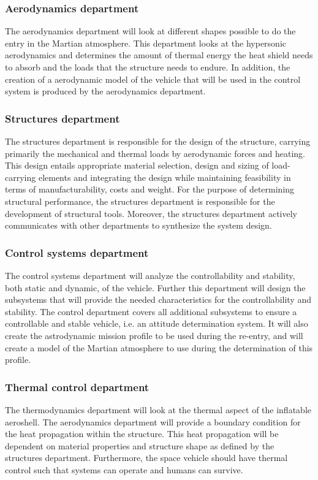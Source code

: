 \subsubsection{Aerodynamics department}\label{subsec:aero}
The aerodynamics department will look at different shapes possible to do the entry in the Martian atmosphere. This department looks at the hypersonic aerodynamics and determines the amount of thermal energy the heat shield needs to absorb and the loads that the structure needs to endure. In addition, the creation of a aerodynamic model of the vehicle that will be used in the control system is produced by the aerodynamics department.

\subsubsection{Structures department}\label{subsec:struct}
The structures department is responsible for the design of the structure, carrying primarily the mechanical and thermal loads by aerodynamic forces and heating. This design entails appropriate material selection, design and sizing of load-carrying elements and integrating the design while maintaining feasibility in terms of manufacturability, costs and weight. For the purpose of determining structural performance, the structures department is responsible for the development of structural tools. Moreover, the structures department actively communicates with other departments to synthesize the system design.

\subsubsection{Control systems department}\label{subsec:control}
The control systems department will analyze the controllability and stability, both static and dynamic, of the vehicle. Further this department will design the subsystems that will provide the needed characteristics for the controllability and stability. The control department covers all additional subsystems to ensure a controllable and stable vehicle, i.e. an attitude determination system. It will also create the astrodynamic mission profile to be used during the re-entry, and will create a model of the Martian atmosphere to use during the determination of this profile.

\subsubsection{Thermal control department}\label{subsec:therm}
The thermodynamics department will look at the thermal aspect of the inflatable aeroshell. The aerodynamics department will provide a boundary condition for the heat propagation within the structure. This heat propagation will be dependent on material properties and structure shape as defined by the structures department. Furthermore, the space vehicle should have thermal control such that systems can operate and humans can survive.